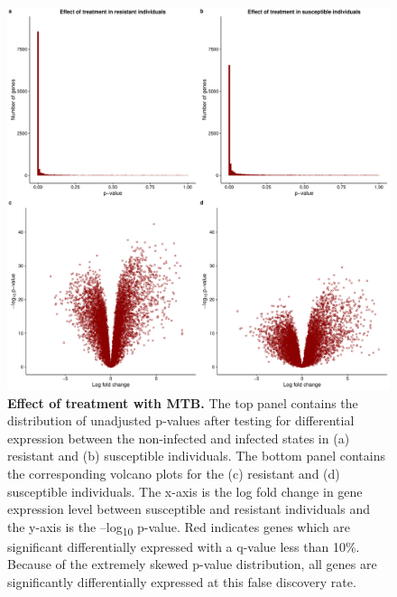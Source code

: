 \begin{figure}[!htb]
\centering \includegraphics[width=5in]{img/ch03/limma-supp.pdf}
\caption[Effect of treatment with MTB.]{ \textbf{Effect of treatment
    with MTB.} The top panel contains the distribution of unadjusted
  p-values after testing for differential expression between the
  non-infected and infected states in (a) resistant and (b)
  susceptible individuals. The bottom panel contains the corresponding
  volcano plots for the (c) resistant and (d) susceptible individuals.
  The x-axis is the log fold change in gene expression level between
  susceptible and resistant individuals and the y-axis is the
  –log\textsubscript{10} p-value. Red indicates genes which are
  significant differentially expressed with a q-value less than 10\%.
  Because of the extremely skewed p-value distribution, all genes are
  significantly differentially expressed at this false discovery rate.
}
\label{fig:limma-supp}
\end{figure}


